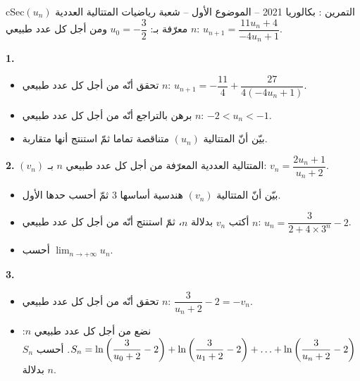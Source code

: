 \documentclass[12pt,a4paper]{article}
\newenvironment{BOX}[2]{\begin{otherlanguage}{english}\begin{arbox}{#1}{#2}}{\end{arbox}\end{otherlanguage}}
\newcounter{exo}
\newenvironment{tamrin}[1]{\stepcounter{exo}\begin{BOX}{cSec}{التمرين \theexo: #1}}{\end{BOX}}
\renewcommand{\dots}{\mathinner{\ldotp\ldotp\ldotp}}
\newcommand{\limn}{\displaystyle\lim_{n\to+\infty}}
\newenvironment{sq}{\begin{itemize}[leftmargin=2.4em,itemsep=3pt]}{\end{itemize}}
\newcommand{\qa}{\item[(أ)]}\newcommand{\qb}{\item[(ب)]}\newcommand{\qc}{\item[(جـ)]}\newcommand{\qd}{\item[(د)]}\newcommand{\qe}{\item[(هـ)]}
\newcommand{\QQ}[1]{\par\smallskip\textbf{#1.} }
\begin{document}
\begin{tamrin}{بكالوريا 2021 -- الموضوع الأول -- شعبة رياضيات}
المتتالية العددية $(u_n)$ معرّفة بـ: $u_0=-\dfrac32$ ومن أجل كل عدد طبيعي $n$: $u_{n+1}=\dfrac{11u_n+4}{-4u_n+1}$.
\QQ{1}
\begin{sq}
\qa تحقق أنّه من أجل كل عدد طبيعي $n$: $u_{n+1}=-\dfrac{11}{4}+\dfrac{27}{4(-4u_n+1)}$.
\qb برهن بالتراجع أنّه من أجل كل عدد طبيعي $n$: $-2<u_n<-1$.
\qc بيّن أنّ المتتالية $(u_n)$ متناقصة تماما ثمّ استنتج أنها متقاربة.
\end{sq}
\QQ{2} $(v_n)$ المتتالية العددية المعرّفة من أجل كل عدد طبيعي $n$ بـ: $v_n=\dfrac{2u_n+1}{u_n+2}$.
\begin{sq}
\qa بيّن أنّ المتتالية $(v_n)$ هندسية أساسها $3$ ثمّ أحسب حدها الأول.
\qb أكتب $v_n$ بدلالة $n$، ثمّ استنتج أنّه من أجل كل عدد طبيعي $n$: $u_n=\dfrac{3}{2+4\times 3^n}-2$.
\qc أحسب $\limn u_n$.
\end{sq}
\QQ{3}
\begin{sq}
\qa تحقق أنّه من أجل كل عدد طبيعي $n$: $\dfrac{3}{u_n+2}-2=-v_n$.
\qb نضع من أجل كل عدد طبيعي $n$: $S_n=\ln\left(\dfrac{3}{u_0+2}-2\right)+\ln\left(\dfrac{3}{u_1+2}-2\right)+\dots+\ln\left(\dfrac{3}{u_n+2}-2\right)$. أحسب $S_n$ بدلالة $n$.
\end{sq}
\end{tamrin}
\end{document}
